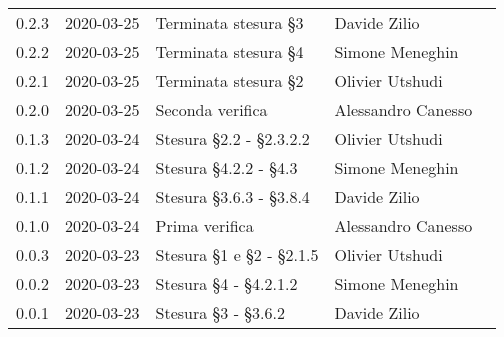 {\begin{longtable}{ c c  C{4cm}  C{3cm}  C{3.5cm} }
		0.2.3 & 2020-03-25 & Terminata stesura \S 3  & Davide Zilio &\adm{}\\
    	0.2.2 & 2020-03-25 & Terminata stesura \S 4 & Simone Meneghin &\adm{}\\	
   		0.2.1 & 2020-03-25 & Terminata stesura \S 2 & Olivier Utshudi &\adm{}\\
   		0.2.0 & 2020-03-25 & Seconda verifica & Alessandro Canesso &\ver{}\\
		0.1.3 & 2020-03-24 & Stesura \S 2.2 - \S 2.3.2.2 & Olivier Utshudi &\adm{}\\
		0.1.2 & 2020-03-24 & Stesura \S 4.2.2 - \S 4.3 & Simone Meneghin &\adm{}\\		
		0.1.1 & 2020-03-24 & Stesura \S 3.6.3 - \S 3.8.4 & Davide Zilio &\adm{}\\
		0.1.0 & 2020-03-24 & Prima verifica & Alessandro Canesso &\ver{}\\
		0.0.3 & 2020-03-23 & Stesura \S 1 e \S 2 - \S 2.1.5 & Olivier Utshudi &\adm{}\\
		0.0.2 & 2020-03-23 & Stesura \S 4 - \S 4.2.1.2 & Simone Meneghin &\adm{}\\
		0.0.1 & 2020-03-23 & Stesura \S 3 - \S 3.6.2 & Davide Zilio &\adm{}\\		
	\end{longtable}
}